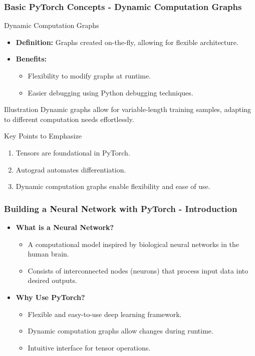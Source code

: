 \documentclass[aspectratio=169]{beamer}
\begin{document}
\begin{frame}[fragile]
    \frametitle{Basic PyTorch Concepts - Dynamic Computation Graphs}
    \begin{block}{Dynamic Computation Graphs}
        \begin{itemize}
            \item \textbf{Definition:} Graphs created on-the-fly, allowing for flexible architecture.
            \item \textbf{Benefits:}
            \begin{itemize}
                \item Flexibility to modify graphs at runtime.
                \item Easier debugging using Python debugging techniques.
            \end{itemize}
        \end{itemize}
    \end{block}

    \begin{block}{Illustration}
        Dynamic graphs allow for variable-length training samples, adapting to different computation needs effortlessly.
    \end{block}

    \begin{block}{Key Points to Emphasize}
        \begin{enumerate}
            \item Tensors are foundational in PyTorch.
            \item Autograd automates differentiation.
            \item Dynamic computation graphs enable flexibility and ease of use.
        \end{enumerate}
    \end{block}
\end{frame}

\begin{frame}
    \frametitle{Building a Neural Network with PyTorch - Introduction}
    \begin{itemize}
        \item \textbf{What is a Neural Network?}
        \begin{itemize}
            \item A computational model inspired by biological neural networks in the human brain.
            \item Consists of interconnected nodes (neurons) that process input data into desired outputs.
        \end{itemize}

        \item \textbf{Why Use PyTorch?}
        \begin{itemize}
            \item Flexible and easy-to-use deep learning framework.
            \item Dynamic computation graphs allow changes during runtime.
            \item Intuitive interface for tensor operations.
        \end{itemize}
    \end{itemize}
\end{frame}
\end{document}
